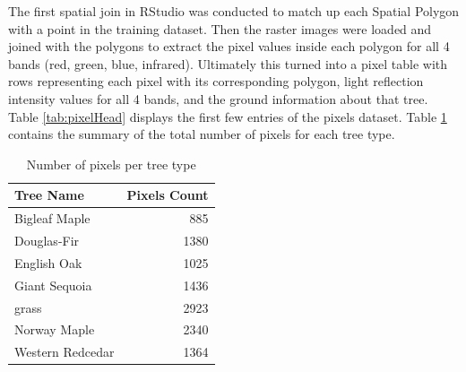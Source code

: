 \documentclass[12pt,twoside]{reedthesis}
\begin{document}
The first spatial join in RStudio was conducted to match up each Spatial Polygon with a point in the training dataset. Then the raster images were loaded and joined with the polygons to extract the pixel values inside each polygon for all 4 bands (red, green, blue, infrared). Ultimately this turned into a pixel table with rows representing each pixel with its corresponding polygon, light reflection intensity values for all 4 bands, and the ground information about that tree. Table \ref{tab:pixelHead} displays the first few entries of the pixels dataset. Table \ref{tab:pixelCounts} contains the summary of the total number of pixels for each tree type.
\begin{table}

\caption{\label{tab:pixelHead}Variables and pixel values included in the pixels dataset}
\centering
{}
\end{table}
\begin{table}

\caption{\label{tab:pixelCounts}Number of pixels per tree type}
\centering
\begin{tabular}[t]{l|r}
\hline
Tree Name & Pixels Count\\
\hline
Bigleaf Maple & 885\\
\hline
Douglas-Fir & 1380\\
\hline
English Oak & 1025\\
\hline
Giant Sequoia & 1436\\
\hline
grass & 2923\\
\hline
Norway Maple & 2340\\
\hline
Western Redcedar & 1364\\
\hline
\end{tabular}
\end{table}
\end{document}
